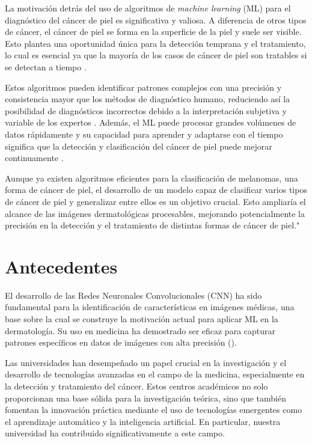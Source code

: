 La motivación detrás del uso de algoritmos de \textit{machine learning} (ML) para el diagnóstico del cáncer de piel es significativa y valiosa. A diferencia de otros tipos de cáncer, el cáncer de piel se forma en la superficie de la piel y suele ser visible. Esto plantea una oportunidad única para la detección temprana y el tratamiento, lo cual es esencial ya que la mayoría de los casos de cáncer de piel son tratables si se detectan a tiempo .

Estos algoritmos pueden identificar patrones complejos con una precisión y consistencia mayor que los métodos de diagnóstico humano, reduciendo así la posibilidad de diagnósticos incorrectos debido a la interpretación subjetiva y variable de los expertos . Además, el ML puede procesar grandes volúmenes de datos rápidamente y su capacidad para aprender y adaptarse con el tiempo significa que la detección y clasificación del cáncer de piel puede mejorar continuamente .

Aunque ya existen algoritmos eficientes para la clasificación de melanomas, una forma de cáncer de piel, el desarrollo de un modelo capaz de clasificar varios tipos de cáncer de piel y generalizar entre ellos es un objetivo crucial. Esto ampliaría el alcance de las imágenes dermatológicas procesables, mejorando potencialmente la precisión en la detección y el tratamiento de distintas formas de cáncer de piel."


\section*{Antecedentes}

El desarrollo de las Redes Neuronales Convolucionales (CNN) ha sido fundamental para la identificación de características en imágenes médicas, una base sobre la cual se construye la motivación actual para aplicar ML en la dermatología. Su uso en medicina ha demostrado ser eficaz para capturar patrones específicos en datos de imágenes con alta precisión ().

Las universidades han desempeñado un papel crucial en la investigación y el desarrollo de tecnologías avanzadas en el campo de la medicina, especialmente en la detección y tratamiento del cáncer. Estos centros académicos no solo proporcionan una base sólida para la investigación teórica, sino que también fomentan la innovación práctica mediante el uso de tecnologías emergentes como el aprendizaje automático y la inteligencia artificial. En particular, nuestra universidad ha contribuido significativamente a este campo.

